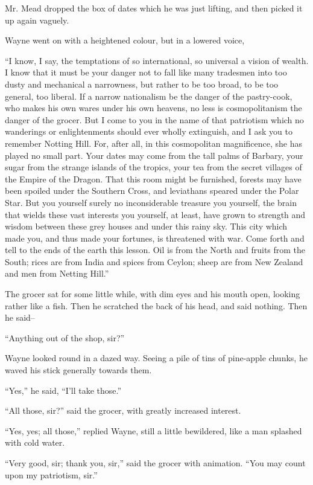 \documentclass{book}
\begin{document}
Mr. Mead dropped the box of dates which he was just lifting, and then picked it up again vaguely.

Wayne went on with a heightened colour, but in a lowered voice,

“I know, I say, the temptations of so international, so universal a vision of wealth. I know that it must be your danger not to fall like many tradesmen into too dusty and mechanical a narrowness, but rather to be too broad, to be too general, too liberal. If a narrow nationalism be the danger of the pastry-cook, who makes his own wares under his own heavens, no less is cosmopolitanism the danger of the grocer. But I come to you in the name of that patriotism which no wanderings or enlightenments should ever wholly extinguish, and I ask you to remember Notting Hill. For, after all, in this cosmopolitan magnificence, she has played no small part. Your dates may come from the tall palms of Barbary, your sugar from the strange islands of the tropics, your tea from the secret villages of the Empire of the Dragon. That this room might be furnished, forests may have been spoiled under the Southern Cross, and leviathans speared under the Polar Star. But you yourself surely no inconsiderable treasure you yourself, the brain that wields these vast interests you yourself, at least, have grown to strength and wisdom between these grey houses and under this rainy sky. This city which made you, and thus made your fortunes, is threatened with war. Come forth and tell to the ends of the earth this lesson. Oil is from the North and fruits from the South; rices are from India and spices from Ceylon; sheep are from New Zealand and men from Netting Hill.”

The grocer sat for some little while, with dim eyes and his mouth open, looking rather like a fish. Then he scratched the back of his head, and said nothing. Then he said–

“Anything out of the shop, sir?”

Wayne looked round in a dazed way. Seeing a pile of tins of pine-apple chunks, he waved his stick generally towards them.

“Yes,” he said, “I’ll take those.”

“All those, sir?” said the grocer, with greatly increased interest.

“Yes, yes; all those,” replied Wayne, still a little bewildered, like a man splashed with cold water.

“Very good, sir; thank you, sir,” said the grocer with animation. “You may count upon my patriotism, sir.”
\end{document}
